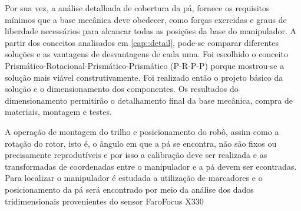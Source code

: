 Por sua vez, a análise detalhada de cobertura da pá, fornece os requisitos
mínimos que a base mecânica deve obedecer, como forças exercidas e graus de liberdade necessários
para alcancar todas as posições da base do manipulador. A partir dos conceitos
analisados em \ref{cap::detail}, pode-se comparar diferentes soluções e as
vantagens de desvantagens de cada uma. Foi escolhido o conceito
Prismático-Rotacional-Prismático-Prismático (P-R-P-P) porque mostrou-se a
solução mais viável construtivamente. Foi realizado então o projeto básico da
solução e o dimensionamento dos componentes. Os resultados do dimensionamento
permitirão o detalhamento final da base mecânica, compra de materiais, montagem
e testes.

A operação de montagem do trilho e posicionamento do robô, assim como
a rotação do rotor, isto é, o ângulo em que a pá se encontra, não são fixos ou
precisamente reprodutíveis e por isso a calibração deve ser realizada e as
transformadas de coordenadas entre o manipulador e a pá devem ser econtradas.
Para localizar o manipulador é estudada a utilização de marcadores e o
posicionamento da pá será encontrado por meio da análise dos dados
tridimensionais provenientes do sensor Faro\textregistered Focus X330
